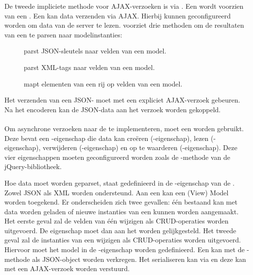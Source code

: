 De tweede impliciete methode voor AJAX-verzoeken is via .
Een  wordt voorzien van een .  
Een  kan data verzenden via AJAX.  
Hierbij kunnen  geconfigureerd worden om data van de server te lezen.
\st{} voorziet drie methoden om de resultaten van een  te parsen naar modelinstanties:
\begin{description}
 \item [] parst JSON-sleutels naar velden van een model.
 \item [] parst XML-tags naar velden van een model.
 \item [] mapt elementen van een rij op velden van een model.
\end{description}
Het verzenden van een JSON- moet met een expliciet AJAX-verzoek gebeuren.
Na het encoderen kan de JSON-data aan het verzoek worden gekoppeld.

\paragraph{\kendo}
Om asynchrone verzoeken naar de  te implementeren, moet een  worden gebruikt.
Deze bevat een -eigenschap die data kan creëren (-eigenschap),  lezen (-eigenschap),  verwijderen (-eigenschap) en op te waarderen (-eigenschap).
Deze vier eigenschappen moeten geconfigureerd worden zoals de -methode van de jQuery-bibliotheek.

Hoe data moet worden geparset, staat gedefinieerd in de -eigenschap van de .
Zowel JSON als XML worden ondersteund.
Aan een  kan een (View) Model worden toegekend.
Er onderscheiden zich twee gevallen:  één bestaand  kan met data worden geladen of nieuwe instanties van een  kunnen worden aangemaakt.
Het eerste geval zal de velden van één  wijzigen als CRUD-operaties worden uitgevoerd.
De eigenschap moet dan aan het  worden gelijkgesteld.
Het tweede geval zal de instanties van een  wijzigen als CRUD-operaties worden uitgevoerd.
Hiervoor moet het model in de -eigenschap worden gedefinieerd.
Een  kan met de -methode als JSON-object worden verkregen.
Het serialiseren kan via  en deze kan met een AJAX-verzoek worden verstuurd.

